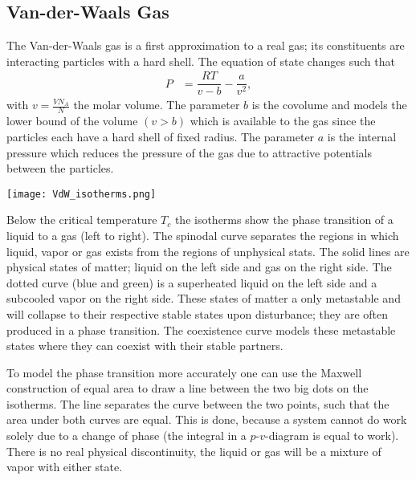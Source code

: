 \documentclass[a4paper,10pt]{article}
\newenvironment{Figure}
  {\par\medskip\noindent\minipage{\linewidth}}
  {\endminipage\par\medskip}%
\numberwithin{equation}{section}
\begin{document}
\begin{multicols}{2}
\subsection{Van-der-Waals Gas}
The Van-der-Waals gas is a first approximation to a real gas; its constituents are interacting particles with a hard shell.
The equation of state changes such that
\begin{align} 
  P &= \dfrac{RT}{v-b}-\dfrac{a}{v^2}
,\end{align} 
with $v=\tfrac{VN_A}{N}$ the molar volume.
The parameter $b$ is the covolume and models the lower bound of the volume $(v>b)$ which is available to the gas since the particles each have a hard shell of fixed radius.
The parameter $a$ is the internal pressure which reduces the pressure of the gas due to attractive potentials between the particles.
\begin{Figure}
  \centering
  \texttt{[image: VdW\_isotherms.png]}
\end{Figure}
Below the critical temperature $T_c$ the isotherms show the phase transition of a liquid to a gas (left to right).
The spinodal curve separates the regions in which liquid, vapor or gas exists from the regions of unphysical stats.
The solid lines are physical states of matter; liquid on the left side and gas on the right side.
The dotted curve (blue and green) is a superheated liquid on the left side and a subcooled vapor on the right side.
These states of matter a only metastable and will collapse to their respective stable states upon disturbance; they are often produced in a phase transition.
The coexistence curve models these metastable states where they can coexist with their stable partners.

To model the phase transition more accurately one can use the Maxwell construction of equal area to draw a line between the two big dots on the isotherms.
The line separates the curve between the two points, such that the area under both curves are equal.
This is done, because a system cannot do work solely due to a change of phase (the integral in a $p$-$v$-diagram is equal to work).
There is no real physical discontinuity, the liquid or gas will be a mixture of vapor with either state.



\end{multicols}
\end{document}
